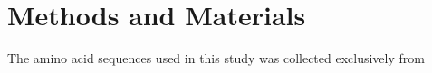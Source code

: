 \section{Methods and Materials}

The amino acid sequences used in this study was collected exclusively from 